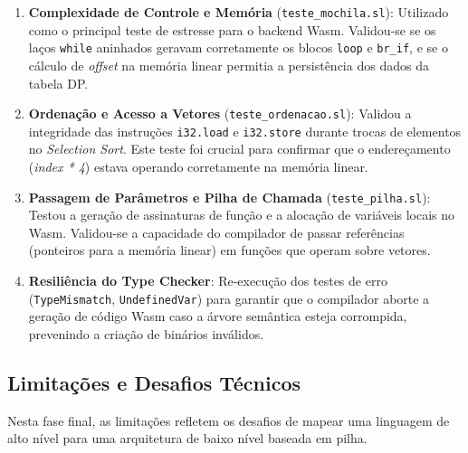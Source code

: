 \documentclass[12pt,a4paper]{article}
\begin{document}
\begin{enumerate}
    \item \textbf{Complexidade de Controle e Memória} (\texttt{teste\_mochila.sl}): Utilizado como o principal teste de estresse para o backend Wasm. Validou-se se os laços \texttt{while} aninhados geravam corretamente os blocos \texttt{loop} e \texttt{br\_if}, e se o cálculo de \textit{offset} na memória linear permitia a persistência dos dados da tabela DP.
    
    \item \textbf{Ordenação e Acesso a Vetores} (\texttt{teste\_ordenacao.sl}): Validou a integridade das instruções \texttt{i32.load} e \texttt{i32.store} durante trocas de elementos no \textit{Selection Sort}. Este teste foi crucial para confirmar que o endereçamento (\textit{index * 4}) estava operando corretamente na memória linear.

    \item \textbf{Passagem de Parâmetros e Pilha de Chamada} (\texttt{teste\_pilha.sl}): Testou a geração de assinaturas de função e a alocação de variáveis locais no Wasm. Validou-se a capacidade do compilador de passar referências (ponteiros para a memória linear) em funções que operam sobre vetores.

    \item \textbf{Resiliência do Type Checker}: Re-execução dos testes de erro (\texttt{TypeMismatch}, \texttt{UndefinedVar}) para garantir que o compilador aborte a geração de código Wasm caso a árvore semântica esteja corrompida, prevenindo a criação de binários inválidos.
\end{enumerate}

\subsection{Limitações e Desafios Técnicos}

Nesta fase final, as limitações refletem os desafios de mapear uma linguagem de alto nível para uma arquitetura de baixo nível baseada em pilha.
\end{document}
